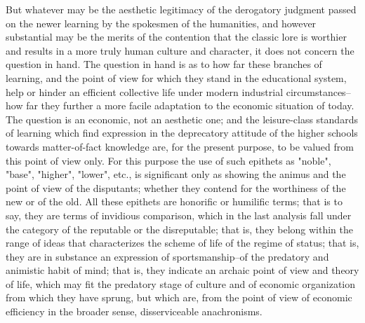 \documentclass[12pt]{report}
\begin{document}
But whatever may be the aesthetic legitimacy of the derogatory judgment
passed on the newer learning by the spokesmen of the humanities, and
however substantial may be the merits of the contention that the
classic lore is worthier and results in a more truly human culture and
character, it does not concern the question in hand. The question in
hand is as to how far these branches of learning, and the point of
view for which they stand in the educational system, help or hinder an
efficient collective life under modern industrial circumstances--how
far they further a more facile adaptation to the economic situation
of today. The question is an economic, not an aesthetic one; and
the leisure-class standards of learning which find expression in the
deprecatory attitude of the higher schools towards matter-of-fact
knowledge are, for the present purpose, to be valued from this point of
view only. For this purpose the use of such epithets as "noble", "base",
"higher", "lower", etc., is significant only as showing the animus
and the point of view of the disputants; whether they contend for the
worthiness of the new or of the old. All these epithets are honorific or
humilific terms; that is to say, they are terms of invidious comparison,
which in the last analysis fall under the category of the reputable or
the disreputable; that is, they belong within the range of ideas that
characterizes the scheme of life of the regime of status; that is, they
are in substance an expression of sportsmanship--of the predatory and
animistic habit of mind; that is, they indicate an archaic point of view
and theory of life, which may fit the predatory stage of culture and of
economic organization from which they have sprung, but which are,
from the point of view of economic efficiency in the broader sense,
disserviceable anachronisms.
\end{document}
